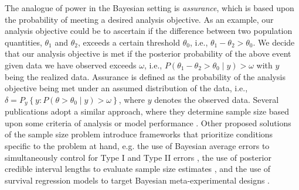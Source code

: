 The analogue of power in the Bayesian setting is \emph{assurance}, which is based upon the probability of meeting a desired analysis objective. As an example, our analysis objective could be to ascertain if the difference between two population quantities, $\theta_1$ and $\theta_2$, exceeds a certain threshold $\theta_0$, i.e., $\theta_1 - \theta_2 > \theta_0$. We decide that our analysis objective is met if the posterior probability of the above event given data we have observed exceeds $\omega$, i.e., $P(\theta_1 - \theta_2 > \theta_0 \mid y) > \omega$ with $y$ being the realized data. Assurance is defined as the probability of the analysis objective being met under an assumed distribution of the data, i.e., $\delta = P_{y}\left\{y: P\left(\theta > \theta_0 \mid {y}\right) > \omega \right\}$, where ${y}$ denotes the observed data. Several publications adopt a similar approach, where they determine sample size based upon some criteria of analysis or model performance \citep{rahme, wang, ohagan}. Other proposed solutions of the sample size problem introduce frameworks that prioritize conditions specific to the problem at hand, e.g. the use of Bayesian average errors to simultaneously control for Type I and Type II errors \citep{reyes}, the use of posterior credible interval lengths to evaluate
sample size estimates \citep{joseph}, and the use of survival regression models to target
Bayesian meta-experimental designs \citep{reyes}.


